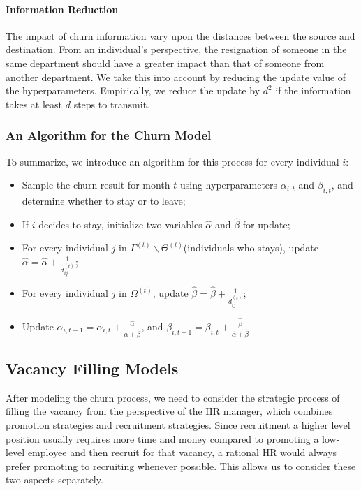 \documentclass[tcn = 37075, sheet = false, abstract = false]{mcmthesis}
\begin{document}
\paragraph{Information Reduction} The impact of churn information vary upon the distances between the source and destination. From an individual's perspective, the resignation of someone in the same department should have a greater impact than that of someone from another department. We take this into account by reducing the update value of the hyperparameters. Empirically, we reduce the update by $d^2$ if the information takes at least $d$ steps to transmit. 

\subsubsection{An Algorithm for the Churn Model}
To summarize, we introduce an algorithm for this process for every individual $i$:
\begin{itemize}
\item Sample the churn result for month $t$ using hyperparameters $\alpha_{i,t}$ and $\beta_{i,t}$, and determine whether to stay or to leave;
\item If $i$ decides to stay, initialize two variables $\hat{\alpha}$ and $\hat{\beta}$ for update;
\item For every individual $j$ in $\Gamma^{(t)} \backslash \Theta^{(t)}$(individuals who stays), update $\displaystyle \hat{\alpha} = \hat{\alpha} + \frac{1}{d_{ij}^{(t)}}$;
\item For every individual $j$ in $\Omega^{(t)}$, update $\displaystyle \hat{\beta} = \hat{\beta} + \frac{1}{d_{ij}^{(t)}}$;
\item Update $\displaystyle \alpha_{i,t+1}=\alpha_{i,t}+\frac{\hat{\alpha}}{\hat{\alpha}+\hat{\beta}}$, and $\displaystyle \beta_{i,t+1}=\beta_{i,t}+\frac{\hat{\beta}}{\hat{\alpha}+\hat{\beta}}$
\end{itemize}


\subsection{Vacancy Filling Models}

After modeling the churn process, we need to consider the strategic process of filling the vacancy from the perspective of the HR manager, which combines promotion strategies and recruitment strategies. Since recruitment a higher level position usually requires more time and money compared to promoting a low-level employee and then recruit for that vacancy, a rational HR would always prefer promoting to recruiting whenever possible. This allows us to consider these two aspects separately.
\end{document}
